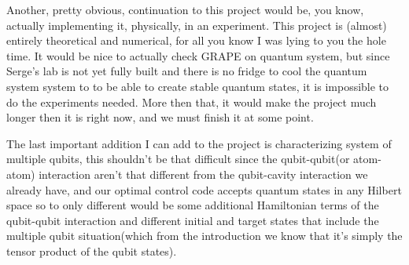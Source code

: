 \documentclass[english, a4paper, 12pt, twoside]{article}
\numberwithin{equation}{section} %
\begin{document}
Another, pretty obvious, continuation to this project would be, you know, actually implementing it, physically, in an experiment. This project is (almost) entirely theoretical and numerical, for all you know I was lying to you the hole time. It would be nice to actually check GRAPE on quantum system, but since Serge's lab is not yet fully built and there is no fridge to cool the quantum system system to to be able to create stable quantum states, it is impossible to do the experiments needed. More then that, it would make the project much longer then it is right now, and we must finish it at some point.

 The last important addition I can add to the project is characterizing system of multiple qubits, this shouldn't be that difficult since the qubit-qubit(or atom-atom) interaction aren't that different from the qubit-cavity interaction we already have, and our optimal control code accepts quantum states in any Hilbert space so to only different would be some additional Hamiltonian terms of the qubit-qubit interaction and different initial and target states that include the multiple qubit situation(which from the introduction we know that it's simply the tensor product of the qubit states).



\appendix

\end{document}
